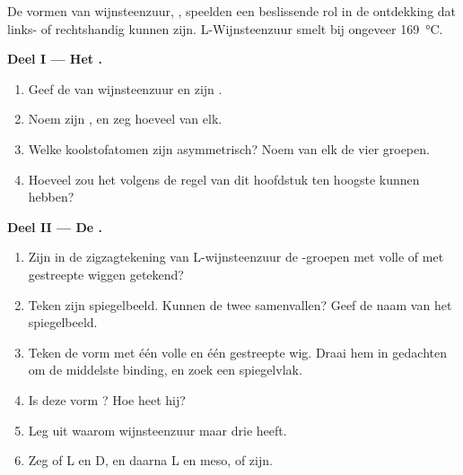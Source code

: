\begin{problem}
\label{pb:g12:stereochemistry:1}
De vormen van wijnsteenzuur, , speelden een
beslissende rol in de ontdekking dat  links- of rechtshandig
kunnen zijn. L-Wijnsteenzuur smelt bij ongeveer \qty{169}{\celsius}.

\medskip
\noindent\textbf{Deel I --- Het .}
\begin{enumerate}
  \item Geef de  van wijnsteenzuur en zijn .
  \item Noem zijn , en zeg hoeveel van elk.
  \item Welke koolstofatomen zijn asymmetrisch? Noem van elk de vier
        groepen.
  \item Hoeveel  zou het volgens de regel van dit
        hoofdstuk ten hoogste kunnen hebben?
\end{enumerate}

\medskip
\noindent\textbf{Deel II --- De .}
\begin{enumerate}[resume]
  \item Zijn in de zigzagtekening van L-wijnsteenzuur de -groepen
        met volle of met gestreepte wiggen getekend?
  \item Teken zijn spiegelbeeld. Kunnen de twee samenvallen? Geef de naam
        van het spiegelbeeld.
  \item Teken de vorm met één volle en één gestreepte wig. Draai hem in
        gedachten om de middelste binding, en zoek een spiegelvlak.
  \item Is deze vorm ? Hoe heet hij?
  \item Leg uit waarom wijnsteenzuur maar drie  heeft.
  \item Zeg of L en D, en daarna L en meso,  of
         zijn.
\end{enumerate}


\end{problem}

